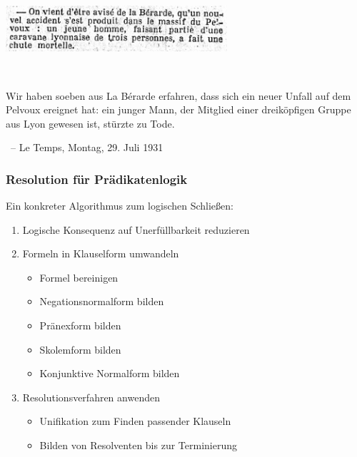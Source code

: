 \documentclass[aspectratio=1610,onlymath]{beamer}
\begin{document}
\maketitle

\bgroup
{}
\begin{frame}[plain]\label{frame_temps_a}
\color{white}
\begin{center}
\includegraphics[height=1.7cm]{images/Le_Temps_1931-07-29_Herbrand-BnF.jpg}\vspace{1cm}

\tt
\begin{minipage}{13.5cm}\normalsize
Wir haben soeben aus La Bérarde erfahren, dass sich ein neuer Unfall auf dem Pelvoux ereignet hat:
ein junger Mann, der Mitglied einer dreiköpfigen Gruppe aus Lyon gewesen ist, stürzte zu Tode.
\end{minipage}

% 
\bigskip\normalsize

~-- Le Temps, Montag, 29. Juli 1931
\end{center}

\end{frame}
\egroup

\begin{frame}\frametitle{Resolution für Prädikatenlogik}

Ein konkreter Algorithmus zum logischen Schließen:
\begin{enumerate}[(1)]
\item \alert{Logische Konsequenz auf Unerfüllbarkeit reduzieren}
\item \alert{Formeln in Klauselform umwandeln}
	\begin{itemize}
	\item Formel bereinigen
	\item Negationsnormalform bilden
	\item Pränexform bilden
	\item Skolemform bilden
	\item Konjunktive Normalform bilden
	\end{itemize}
\item \alert{Resolutionsverfahren anwenden}
	\begin{itemize}
	\item Unifikation zum Finden passender Klauseln
	\item \textcolor{devilscss}{Bilden von Resolventen bis zur Terminierung}
	\end{itemize}
\end{enumerate}

\end{frame}
\end{document}
